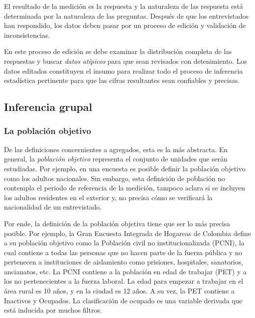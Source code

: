 \documentclass[
  12pt,
  spanish,
]{book}
\begin{document}
El resultado de la medición es la respuesta y la naturaleza de las respuesta está determinada por la naturaleza de las preguntas. Después de que los entrevistados han respondido, los datos deben pasar por un proceso de edición y validación de inconsistencias.

En este proceso de edición se debe examinar la distribución completa de las respuestas y buscar \emph{datos atípicos} para que sean revisados con detenimiento. Los datos editados constituyen el insumo para realizar todo el proceso de inferencia estadística pertinente para que las cifras resultantes sean confiables y precisas.

\hypertarget{inferencia-grupal}{%
\subsection{Inferencia grupal}\label{inferencia-grupal}}

\hypertarget{la-poblaciuxf3n-objetivo}{%
\subsubsection{La población objetivo}\label{la-poblaciuxf3n-objetivo}}

De las definiciones concernientes a agregados, esta es la más abstracta. En general, la \emph{población objetivo} representa el conjunto de unidades que serán estudiadas. Por ejemplo, en una encuesta es posible definir la población objetivo como los adultos nacionales. Sin embargo, esta definición de población no contempla el periodo de referencia de la medición, tampoco aclara si se incluyen los adultos residentes en el exterior y, no precisa cómo se verificará la nacionalidad de un entrevistado.

Por ende, la definición de la población objetiva tiene que ser lo más precisa posible. Por ejemplo, la Gran Encuesta Integrada de Hogareas de Colombia define a su población objetivo como la Población civil no institucionalizada (PCNI), la cual contiene a todas las personas que no hacen parte de la fuerza pública y no pertenecen a instituciones de aislamiento como prisiones, hospitales, sanatorios, ancianatos, etc. La PCNI contiene a la población en edad de trabajar (PET) y a los no pertenecientes a la fuerza laboral. La edad para empezar a trabajar en el área rural es 10 años, y en la ciudad es 12 años. A su vez, la PET contiene a Inactivos y Ocupados. La clasificación de ocupado es una variable derivada que está inducida por muchos filtros.
\end{document}
